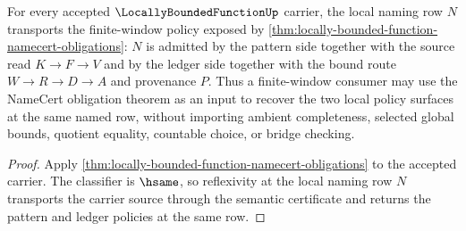 \begin{theorem}
\label{thm:locally-bounded-function-finite-window-policy-transport}
For every accepted $\LocallyBoundedFunctionUp$ carrier, the local naming row $N$ transports the finite-window policy exposed by \autoref{thm:locally-bounded-function-namecert-obligations}: $N$ is admitted by the pattern side together with the source read $K\to F\to V$ and by the ledger side together with the bound route $W\to R\to D\to A$ and provenance $P$. Thus a finite-window consumer may use the NameCert obligation theorem as an input to recover the two local policy surfaces at the same named row, without importing ambient completeness, selected global bounds, quotient equality, countable choice, or bridge checking.
\end{theorem}
\begin{proof}
Apply \autoref{thm:locally-bounded-function-namecert-obligations} to the accepted carrier. The classifier is $\hsame$, so reflexivity at the local naming row $N$ transports the carrier source through the semantic certificate and returns the pattern and ledger policies at the same row.
\end{proof}

